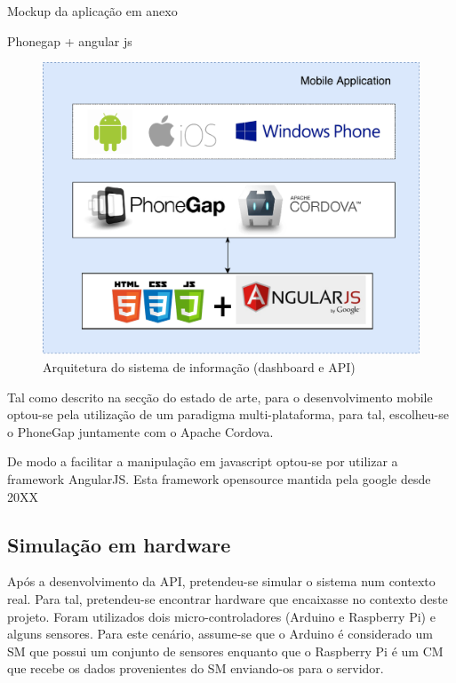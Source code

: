 Mockup da aplicação em anexo 

Phonegap + angular js


\begin{figure}[h]
	\centering
	\includegraphics[scale = 0.5]{esquemas/arquitetura-mobile.pdf}
	\caption{Arquitetura do sistema de informação (dashboard e API)}
	\label{arquiteturamobile}
\end{figure}



Tal como descrito na secção do estado de arte, para o desenvolvimento mobile optou-se pela utilização de um paradigma multi-plataforma, para tal, escolheu-se o PhoneGap juntamente com o Apache Cordova. 




De modo a facilitar a manipulação em javascript optou-se por utilizar a framework AngularJS. Esta framework opensource mantida pela google desde 20XX 



\newpage
\subsection{Simulação em hardware}


Após a desenvolvimento da API, pretendeu-se simular o sistema num contexto real. Para tal, pretendeu-se encontrar hardware que encaixasse no contexto deste projeto. Foram utilizados dois micro-controladores (Arduino e Raspberry Pi) e alguns sensores. Para este cenário, assume-se que o Arduino é considerado um \acl{SM} que possui um conjunto de sensores enquanto que o Raspberry Pi é um \acl{CM} que recebe os dados provenientes do \acl{SM} enviando-os para o servidor.  

